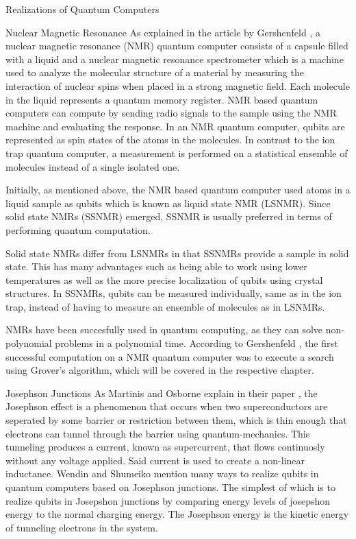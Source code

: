 \documentclass[aps,preprintnumbers,twocolumn]{revtex4}
\begin{document}
\begin{section}{Realizations of Quantum Computers}
\begin{subsection}{Nuclear Magnetic Resonance}
As explained in the article by Gershenfeld \cite[p.66-71]{Gershenfeld1998QuantumCW}, a nuclear magnetic resonance (NMR) quantum computer consists of a capsule filled with a liquid and a nuclear magnetic resonance spectrometer which is a machine used to analyze the molecular structure of a material by measuring the interaction of nuclear spins when placed in a strong magnetic field.
Each molecule in the liquid represents a quantum memory register. 
NMR based quantum computers can compute by sending radio signals to the sample using the NMR machine and evaluating the response. 
In an NMR quantum computer, qubits are represented as spin states of the atoms in the molecules. 
In contrast to the ion trap quantum computer, 
a measurement is performed on a statistical ensemble of molecules instead of a single isolated one. 

Initially, as mentioned above, the NMR based quantum computer used atoms in a liquid sample as qubits which is known as liquid state NMR (LSNMR). 
Since solid state NMRs (SSNMR) emerged, SSNMR is usually preferred in terms of performing quantum computation.

Solid state NMRs differ from LSNMRs in that SSNMRs provide a sample in solid state.
This has many advantages such as being able to work using lower temperatures as well as the more precise localization of qubits using crystal structures.
In SSNMRs, qubits can be measured individually, same as in the ion trap,
instead of having to measure an ensemble of molecules as in LSNMRs. 

NMRs have been succesfully used in quantum computing, as they can solve non-polynomial problems in a polynomial time.
According to Gershenfeld \cite[p.69]{Gershenfeld1998QuantumCW}, the first successful computation on a NMR quantum computer was to execute a search using Grover's algorithm, 
which will be covered in the respective chapter. 
\end{subsection}

\begin{subsection}{Josephson Junctions}
As Martinis and Osborne explain in their paper \cite[p.3-6]{martinis}, 
the Josephson effect is a phenomenon that occurs when two superconductors are seperated 
by some barrier or restriction between them, which is thin enough that electrons can tunnel through the barrier using quantum-mechanics. 
This tunneling produces a current, known as supercurrent, that flows continuosly without any voltage applied.
Said current is used to create a non-linear inductance. 
Wendin and Shumeiko mention \cite[p.727]{shumeiko} many ways to realize qubits in quantum computers based on Josephson junctions. 
The simplest of which is to realize qubits in Josepshon junctions by comparing energy levels of josepshon energy to the normal charging energy. 
The Josephson energy is the kinetic energy of tunneling electrons in the system.


\end{subsection}
\end{section}
\end{document}
